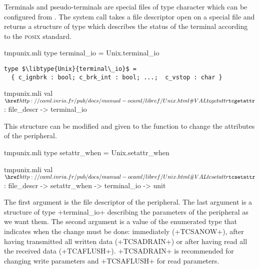 Terminals and pseudo-terminals are special files of type character
which can be configured from {\ocaml}. The system call
 takes a file descriptor open on a special file
and returns a structure of type  which
describes the status of the terminal according to the \textsc{posix} 
standard.
%
\begin{codefile}{tmpunix.mli}
type terminal_io = Unix.terminal_io
\end{codefile}
%
\begin{lstlisting}
type $\libtype{Unix}{terminal\_io}$ = 
  { c_ignbrk : bool; c_brk_int : bool; ...;  c_vstop : char }
\end{lstlisting}
%
\begin{listingcodefile}{tmpunix.mli}
val $\libvalue{Unix}{tcgetattr}$ : file_descr -> terminal_io
\end{listingcodefile}
%
This structure can be modified and given to the function 
 to change the attributes of the peripheral.
%
\begin{codefile}{tmpunix.mli}
type setattr_when = Unix.setattr_when
\end{codefile}
%
\begin{listingcodefile}{tmpunix.mli}
val $\libvalue{Unix}{tcsetattr}$ : file_descr -> setattr_when -> terminal_io -> unit
\end{listingcodefile}
% 

The first argument is the file descriptor of the peripheral. The last
argument is a structure of type \ml+terminal_io+ describing the
parameters of the peripheral as we want them. The second argument is a
value of the enumerated type  that
indicates when the change must be done: immediately (\ml+TCSANOW+),
after having transmitted all written data (\ml+TCSADRAIN+) or after
having read all the received data (\ml+TCAFLUSH+). \ml+TCSADRAIN+ is
recommended for changing write parameters and \ml+TCSAFLUSH+ for read
parameters.

